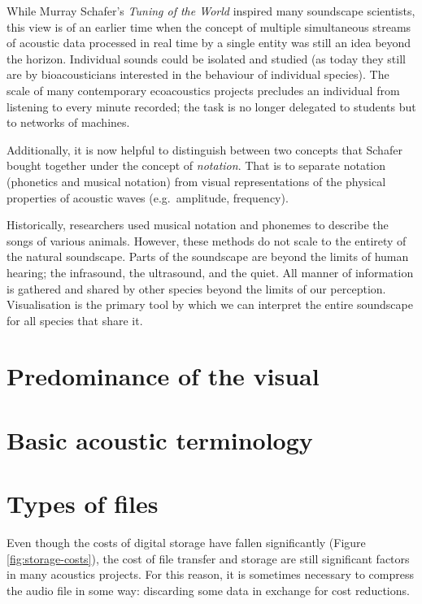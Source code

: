 \documentclass[
]{book}
\begin{document}
While Murray Schafer's \emph{Tuning of the World} \citep{schafer1977} inspired many soundscape scientists, this view is of an earlier time when the concept of multiple simultaneous streams of acoustic data processed in real time by a single entity was still an idea beyond the horizon. Individual sounds could be isolated and studied (as today they still are by bioacousticians interested in the behaviour of individual species). The scale of many contemporary ecoacoustics projects precludes an individual from listening to every minute recorded; the task is no longer delegated to students but to networks of machines.

Additionally, it is now helpful to distinguish between two concepts that Schafer bought together under the concept of \emph{notation}. That is to separate notation (phonetics and musical notation) from visual representations of the physical properties of acoustic waves (e.g.~amplitude, frequency).

Historically, researchers used musical notation and phonemes to describe the songs of various animals. However, these methods do not scale to the entirety of the natural soundscape. Parts of the soundscape are beyond the limits of human hearing; the infrasound, the ultrasound, and the quiet. All manner of information is gathered and shared by other species beyond the limits of our perception. Visualisation is the primary tool by which we can interpret the entire soundscape for all species that share it.

\hypertarget{predominance-of-the-visual}{%
\section{Predominance of the visual}\label{predominance-of-the-visual}}

\hypertarget{basic-acoustic-terminology}{%
\section{Basic acoustic terminology}\label{basic-acoustic-terminology}}

\hypertarget{types-of-files}{%
\section{Types of files}\label{types-of-files}}

Even though the costs of digital storage have fallen significantly (Figure \ref{fig:storage-costs}), the cost of file transfer and storage are still significant factors in many acoustics projects. For this reason, it is sometimes necessary to compress the audio file in some way: discarding some data in exchange for cost reductions.
\end{document}
